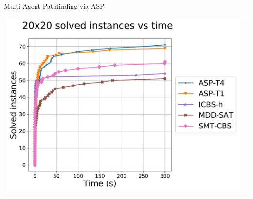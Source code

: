 \documentclass{beamer}
\begin{document}
\begin{frame}{Multi-Agent Pathfinding via ASP}
\begin{tabular}{cc}
\begin{minipage}{.3\textwidth}
   \includegraphics[width=1.3\textwidth]{20x20_obs_runtime_new.pdf}
\end{minipage}

\end{tabular}
\end{frame}
\end{document}
